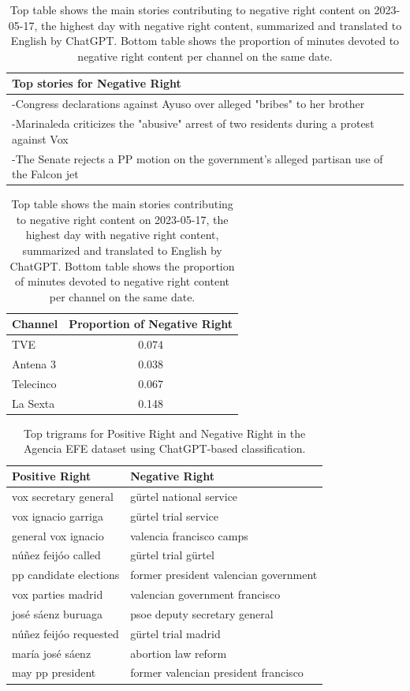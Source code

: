 \documentclass[12pt]{article}
\begin{document}
	
		\begin{table}[!htb]
		\centering
		\begin{tabular}{p{}}
			\toprule
			\textbf{Top stories for  Negative Right}  \\
			\midrule
			-Congress declarations against Ayuso over alleged "bribes" to her brother  \\
			-Marinaleda criticizes the "abusive" arrest of two residents during a protest against Vox  \\
			-The Senate rejects a PP motion on the government's alleged partisan use of the Falcon jet  \\
			\bottomrule
		\end{tabular}
	
		

		\begin{tabular}{l c}
			\toprule
			\textbf{Channel} & \textbf{Proportion of Negative Right} \\
			\midrule
			TVE & 0.074 \\
			Antena 3  & 0.038 \\
			Telecinco  & 0.067 \\
			La Sexta  & 0.148 \\
			\bottomrule
		\end{tabular}
		\caption{Top table shows the main stories contributing to negative right content on 2023-05-17, the highest day with negative right content,  summarized and translated to English by ChatGPT. Bottom table shows the proportion of minutes devoted to negative right content per channel on the same date. }
		\label{tab:neg_right_channels}
	\end{table}
	
	\begin{table}[!htb]
		\centering
		\begin{tabular}{|l|l|}
			\hline
			Positive Right & Negative Right \\
			\hline
			vox secretary general & gürtel national service \\
			vox ignacio garriga & gürtel trial service \\
			general vox ignacio & valencia francisco camps \\
			núñez feijóo called & gürtel trial gürtel \\
			pp candidate elections & former president valencian government \\
			vox parties madrid & valencian government francisco \\
			josé sáenz buruaga & psoe deputy secretary general \\
			núñez feijóo requested & gürtel trial madrid \\
			maría josé sáenz & abortion law reform \\
			may pp president & former valencian president francisco \\
			\hline
		\end{tabular}
		\caption{Top trigrams for Positive Right and Negative Right in the Agencia EFE dataset using ChatGPT-based classification.}
		\label{tab:top_words_pos_right_neg_right}
	\end{table}
	
\end{document}
